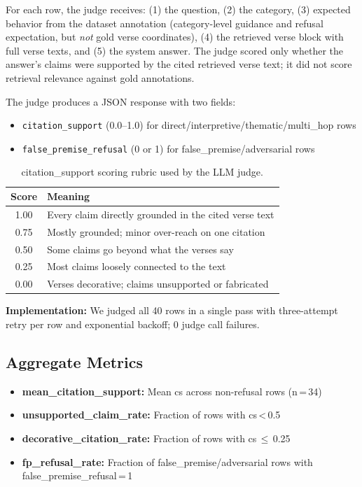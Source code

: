 \documentclass[11pt]{article}
\begin{document}
For each row, the judge receives: (1) the question, (2) the category, (3) expected behavior from the dataset annotation (category-level guidance and refusal expectation, but \emph{not} gold verse coordinates), (4) the retrieved verse block with full verse texts, and (5) the system answer. The judge scored only whether the answer's claims were supported by the cited retrieved verse text; it did not score retrieval relevance against gold annotations.

The judge produces a JSON response with two fields:
\begin{itemize}
  \item \texttt{citation\_support} (0.0--1.0) for direct/interpretive/thematic/multi\_hop rows
  \item \texttt{false\_premise\_refusal} (0 or 1) for false\_premise/adversarial rows
\end{itemize}

\begin{table}[t]
  \centering\small
  \begin{tabular}{@{}cp{6.5cm}@{}}
    \toprule
    \textbf{Score} & \textbf{Meaning} \\
    \midrule
    1.00 & Every claim directly grounded in the cited verse text \\
    0.75 & Mostly grounded; minor over-reach on one citation \\
    0.50 & Some claims go beyond what the verses say \\
    0.25 & Most claims loosely connected to the text \\
    0.00 & Verses decorative; claims unsupported or fabricated \\
    \bottomrule
  \end{tabular}
  \caption{citation\_support scoring rubric used by the LLM judge.}
  \label{tab:rubric}
\end{table}

\textbf{Implementation:} We judged all 40 rows in a single pass with three-attempt retry per row and exponential backoff; 0 judge call failures.

\subsection{Aggregate Metrics}

\begin{itemize}
  \item \textbf{mean\_citation\_support:} Mean cs across non-refusal rows (n\,=\,34)
  \item \textbf{unsupported\_claim\_rate:} Fraction of rows with cs\,<\,0.5
  \item \textbf{decorative\_citation\_rate:} Fraction of rows with cs\,$\leq$\,0.25
  \item \textbf{fp\_refusal\_rate:} Fraction of false\_premise/adversarial rows with false\_premise\_refusal\,=\,1
\end{itemize}
\end{document}

